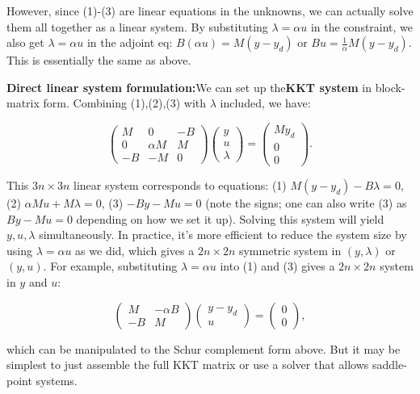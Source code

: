 \documentclass[a4paper,10pt]{report}
\begin{document}
However, since (1)-(3) are linear equations in the unknowns, we can actually solve them all together as a linear system. By substituting \(\lambda=\alpha u\) in the constraint, we also get \(\lambda = \alpha u\) in the adjoint eq: \(B(\alpha u) = M(y - y_d)\) or \(B u = \frac{1}{\alpha}M(y - y_d)\). This is essentially the same as above.

\textbf{Direct linear system formulation:}We can set up the\textbf{KKT system} in block-matrix form. Combining (1),(2),(3) with \(\lambda\) included, we have:

\[
	\begin{pmatrix}
		M  & 0        & -B \\
		0  & \alpha M & M  \\
		-B & -M       & 0
	\end{pmatrix}
	\begin{pmatrix} y \\ u \\ \lambda \end{pmatrix}
	=
	\begin{pmatrix} M y_d \\ 0 \\ 0 \end{pmatrix}.
\]

This \(3n \times 3n\) linear system corresponds to equations:
(1) \(M(y - y_d) - B\lambda = 0\),
(2) \(\alpha M u + M \lambda = 0\),
(3) \(-B y - M u = 0\) (note the signs; one can also write (3) as \(B y - M u = 0\) depending on how we set it up). Solving this system will yield \(y, u, \lambda\) simultaneously.
In practice, it's more efficient to reduce the system size by using \(\lambda = \alpha u\) as we did, which gives a \(2n \times 2n\) symmetric system in \((y,\lambda)\) or \((y,u)\). For example, substituting \(\lambda=\alpha u\) into (1) and (3) gives a \(2n\times 2n\) system in \(y\) and \(u\):

\[
	\begin{pmatrix}
		M  & -\alpha B \\
		-B & M
	\end{pmatrix}
	\begin{pmatrix} y - y_d \\ u \end{pmatrix}
	= \begin{pmatrix} 0 \\ 0 \end{pmatrix},
\]

which can be manipulated to the Schur complement form above. But it may be simplest to just assemble the full KKT matrix or use a solver that allows saddle-point systems.
\end{document}
